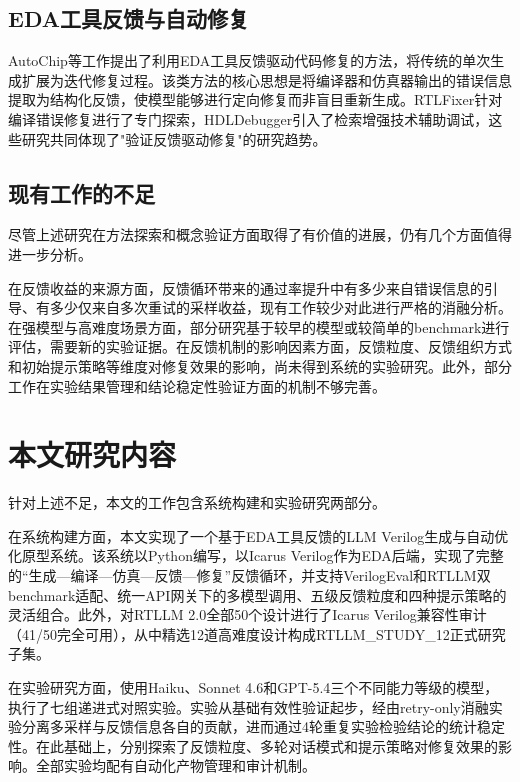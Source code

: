 \subsection{EDA工具反馈与自动修复}

AutoChip\cite{autochip}等工作提出了利用EDA工具反馈驱动代码修复的方法，将传统的单次生成扩展为迭代修复过程。该类方法的核心思想是将编译器和仿真器输出的错误信息提取为结构化反馈，使模型能够进行定向修复而非盲目重新生成。RTLFixer\cite{rtlfixer}针对编译错误修复进行了专门探索，HDLDebugger\cite{hdldebugger}引入了检索增强技术辅助调试，这些研究共同体现了"验证反馈驱动修复"的研究趋势。

\subsection{现有工作的不足}

尽管上述研究在方法探索和概念验证方面取得了有价值的进展，仍有几个方面值得进一步分析。

在反馈收益的来源方面，反馈循环带来的通过率提升中有多少来自错误信息的引导、有多少仅来自多次重试的采样收益，现有工作较少对此进行严格的消融分析。在强模型与高难度场景方面，部分研究基于较早的模型或较简单的benchmark进行评估，需要新的实验证据。在反馈机制的影响因素方面，反馈粒度、反馈组织方式和初始提示策略等维度对修复效果的影响，尚未得到系统的实验研究。此外，部分工作在实验结果管理和结论稳定性验证方面的机制不够完善。

\section{本文研究内容}

针对上述不足，本文的工作包含系统构建和实验研究两部分。

在系统构建方面，本文实现了一个基于EDA工具反馈的LLM Verilog生成与自动优化原型系统。该系统以Python编写，以Icarus Verilog作为EDA后端，实现了完整的``生成—编译—仿真—反馈—修复''反馈循环，并支持VerilogEval和RTLLM双benchmark适配、统一API网关下的多模型调用、五级反馈粒度和四种提示策略的灵活组合。此外，对RTLLM 2.0全部50个设计进行了Icarus Verilog兼容性审计（41/50完全可用），从中精选12道高难度设计构成RTLLM\_STUDY\_12正式研究子集。

在实验研究方面，使用Haiku、Sonnet 4.6和GPT-5.4三个不同能力等级的模型，执行了七组递进式对照实验。实验从基础有效性验证起步，经由retry-only消融实验分离多采样与反馈信息各自的贡献，进而通过4轮重复实验检验结论的统计稳定性。在此基础上，分别探索了反馈粒度、多轮对话模式和提示策略对修复效果的影响。全部实验均配有自动化产物管理和审计机制。

